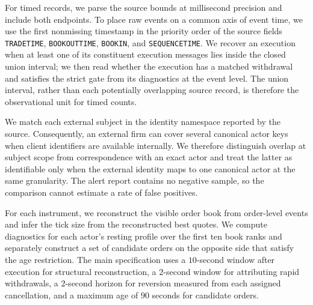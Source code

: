 \documentclass[11pt]{article}
\newenvironment{review}{\begingroup\color{blue}}{\endgroup}
\begin{document}
For timed records, we parse the source bounds at millisecond precision and include both endpoints. To place raw events on \begin{review}a common axis of event time\end{review}, we use the first nonmissing timestamp in \begin{review}the priority order of the source fields\end{review} \texttt{TRADETIME},
\texttt{BOOKOUTTIME}, \texttt{BOOKIN}, and \texttt{SEQUENCETIME}. We recover an execution when at least one of its
constituent execution messages lies inside the closed union interval; \begin{review}we then read whether the execution has a matched withdrawal and satisfies the strict gate from its diagnostics at the event level\end{review}. The union interval, rather than each potentially overlapping source record, is therefore
the observational unit for timed counts.

We match each external subject in the identity namespace reported by the source. Consequently, an external firm can cover
several canonical actor keys when client identifiers are available internally. We therefore distinguish \begin{review}overlap at subject scope from correspondence with an exact actor\end{review} and treat the latter as identifiable only when the external identity maps to one
canonical actor at the same granularity. The alert report contains no negative sample, so the comparison cannot estimate \begin{review}a rate of false positives\end{review}.

For each instrument, we reconstruct the visible order book from order-level events and infer the tick size from the
reconstructed best quotes. \begin{review}We compute diagnostics for each actor's resting profile over the first ten book ranks and separately construct a set of candidate orders on the opposite side that satisfy the age restriction.\end{review} \begin{review}The main specification uses a $10$-second window after execution for structural reconstruction, a $2$-second window for attributing rapid withdrawals, a $2$-second horizon for reversion measured from each assigned cancellation, and a maximum age of $90$ seconds for candidate orders.\end{review}
\end{document}
